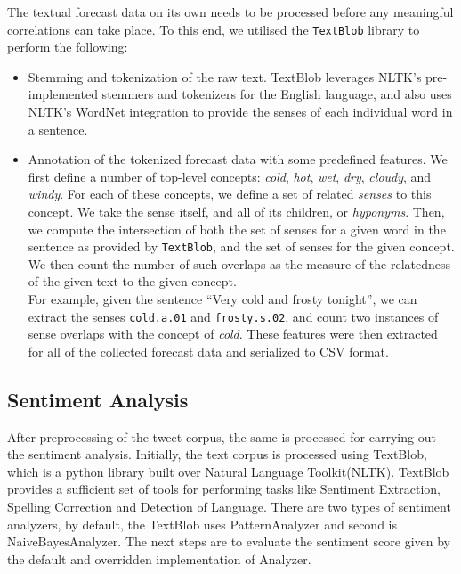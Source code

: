 \documentclass[a4paper,10pt]{article}
\begin{document}
    The textual forecast data on its own needs to be processed before any meaningful correlations can take place. To this end, we utilised the \texttt{TextBlob} library to perform the following:
    \begin{itemize}
        \item{
            Stemming and tokenization of the raw text. TextBlob leverages NLTK's pre-implemented stemmers and tokenizers for the English language, and also uses NLTK's WordNet integration to provide the senses of each individual word in a sentence.
        }
        \item{
            Annotation of the tokenized forecast data with some predefined features. We first define a number of top-level concepts: \textit{cold}, \textit{hot}, \textit{wet}, \textit{dry}, \textit{cloudy}, and \textit{windy}. For each of these concepts, we define a set of related \textit{senses} to this concept. We take the sense itself, and all of its children, or \textit{hyponyms}. Then, we compute the intersection of both the set of senses for a given word in the sentence as provided by \texttt{TextBlob}, and the set of senses for the given concept. We then count the number of such overlaps as the measure of the relatedness of the given text to the given concept. \\
            For example, given the sentence ``Very cold and frosty tonight'', we can extract the senses \texttt{cold.a.01} and \texttt{frosty.s.02}, and count two instances of sense overlaps with the concept of \textit{cold}. These features were then extracted for all of the collected forecast data and serialized to CSV format.
        }
    \end{itemize}

	\subsection{Sentiment Analysis}
	
	After preprocessing of the tweet corpus, the same is processed for carrying out the sentiment analysis. Initially, the text corpus is processed using TextBlob, which is a python library built over Natural Language Toolkit(NLTK). TextBlob provides a sufficient set of tools for performing tasks like Sentiment Extraction, Spelling Correction and Detection of Language. There are two types of sentiment analyzers, by default, the TextBlob uses PatternAnalyzer and second is NaiveBayesAnalyzer. The next steps are to evaluate the sentiment score given by the default and overridden implementation of Analyzer. 
\end{document}
